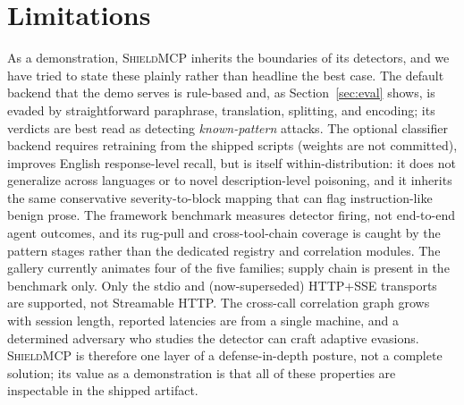\documentclass[11pt]{article}
\newcommand{\shield}{\textsc{ShieldMCP}}
\begin{document}
\section*{Limitations}

As a demonstration, \shield{} inherits the boundaries of its detectors, and we have
tried to state these plainly rather than headline the best case. The default backend
that the demo serves is rule-based and, as Section~\ref{sec:eval} shows, is evaded by
straightforward paraphrase, translation, splitting, and encoding; its verdicts are
best read as detecting \emph{known-pattern} attacks. The optional classifier backend
requires retraining from the shipped scripts (weights are not committed), improves
English response-level recall, but is itself within-distribution: it does not
generalize across languages or to novel description-level poisoning, and it inherits
the same conservative severity-to-block mapping that can flag instruction-like benign
prose. The framework benchmark measures detector firing, not end-to-end agent
outcomes, and its rug-pull and cross-tool-chain coverage is caught by the pattern
stages rather than the dedicated registry and correlation modules. The gallery
currently animates four of the five families; supply chain is present in the
benchmark only. Only the stdio and (now-superseded) HTTP+SSE transports are
supported, not Streamable HTTP. The cross-call correlation graph grows with session
length, reported latencies are from a single machine, and a determined adversary who
studies the detector can craft adaptive evasions. \shield{} is therefore one layer of
a defense-in-depth posture, not a complete solution; its value as a demonstration is
that all of these properties are inspectable in the shipped artifact.



\end{document}
